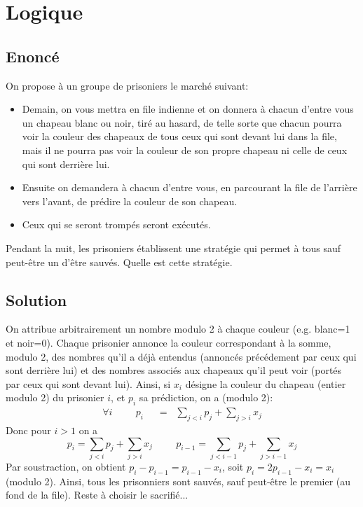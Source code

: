 \documentclass{article}
\newcommand{\eqnsymb}[1]{\;\;{#1}\;\;}
\newenvironment{statement}{\subsection{Enoncé}}{\pagebreak}
\newenvironment{solution}{\subsection{Solution}}{\pagebreak}
\begin{document}
\section{Logique}
\begin{statement}
On propose à un groupe de prisoniers le marché suivant:
\begin{itemize}
\item
Demain, on vous mettra en file indienne et on donnera à chacun d'entre vous un chapeau blanc ou noir, tiré au hasard, de telle sorte que chacun pourra voir la couleur des chapeaux de tous ceux qui sont devant lui dans la file, mais il ne pourra pas voir la couleur de son propre chapeau ni celle de ceux qui sont derrière lui.
\item
Ensuite on demandera à chacun d'entre vous, en parcourant la file de l'arrière vers l'avant, de prédire la couleur de son chapeau.
\item
Ceux qui se seront trompés seront exécutés.
\end{itemize}
Pendant la nuit, les prisoniers établissent une stratégie qui permet à tous sauf peut-être un d'être sauvés. Quelle est cette stratégie.
\end{statement}
\begin{solution}
On attribue arbitrairement un nombre modulo 2 à chaque couleur (e.g. blanc=1 et noir=0). Chaque prisonier annonce la couleur correspondant à la somme, modulo 2, des nombres qu'il a déjà entendus (annoncés précédement par ceux qui sont derrière lui) et des nombres associés aux chapeaux qu'il peut voir (portés par ceux qui sont devant lui). Ainsi, si $x_i$ désigne la couleur du chapeau (entier modulo 2) du prisonier $i$, et $p_i$ sa prédiction, on a (modulo 2):
\begin{align*}
\forall i\hspace{1cm}p_i & \eqnsymb{=} \sum_{j<i}p_j+\sum_{j>i}x_j
\end{align*}
Donc pour $i>1$ on a
\[
p_i = \sum_{j<i}p_j+\sum_{j>i}x_j
\hspace{1cm}
p_{i-1} = \sum_{j<i-1}p_j+\sum_{j>i-1}x_j
\]
Par soustraction, on obtient $p_i-p_{i-1}=p_{i-1}-x_i$, soit $p_i=2p_{i-1}-x_i=x_i$ (modulo 2). Ainsi, tous les prisonniers sont sauvés, sauf peut-être le premier (au fond de la file). Reste à choisir le sacrifié...
\end{solution}
\end{document}

